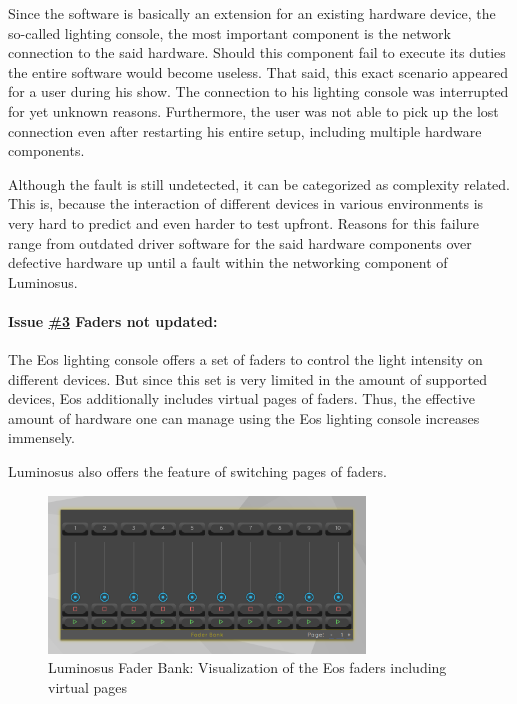 \documentclass{scrreprt}
\begin{document}
Since the software is basically an extension for an existing hardware device, the so-called lighting console, the most important component is the network connection to the said hardware. Should this component fail to execute its duties the entire software would become useless.
That said, this exact scenario appeared for a user during his show. The connection to his lighting console was interrupted for yet unknown reasons. Furthermore, the user was not able to pick up the lost connection even after restarting his entire setup, including multiple hardware components.

Although the fault is still undetected, it can be categorized as complexity related. This is, because the interaction of different devices in various environments is very hard to predict and even harder to test upfront. Reasons for this failure range from outdated driver software for the said hardware components over defective hardware up until a fault within the networking component of Luminosus.

\paragraph{Issue \href{https://github.com/ETCLabs/LuminosusEosEdition/issues/3}{\#3} Faders not updated:}

The Eos lighting console offers a set of faders to control the light intensity on different devices. But since this set is very limited in the amount of supported devices, Eos additionally includes virtual pages of faders. Thus, the effective amount of hardware one can manage using the Eos lighting console increases immensely.

Luminosus also offers the feature of switching pages of faders. 

\begin{figure}[H]
	\centering
	\includegraphics[width=0.75\textwidth]{img/luminosus_faders}
	\caption[Luminosus Fader Bank]{Luminosus Fader Bank: Visualization of the Eos faders including virtual pages}
	\label{fig:luminosus_faders}
\end{figure}
\end{document}
